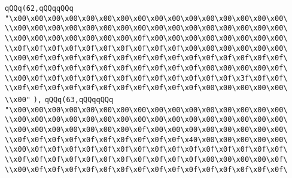 \verb|qQQq(62,qQQqqQQq|\newline
\verb|"\x00\x00\x00\x00\x00\x00\x00\x00\x00\x00\x00\x00\x00\x00\x00\x00\|\newline
\verb|\\x00\x00\x00\x00\x00\x00\x00\x00\x00\x00\x00\x00\x00\x00\x00\x00\|\newline
\verb|\\x00\x00\x00\x00\x00\x00\x00\x0f\x00\x00\x00\x00\x00\x00\x00\x00\|\newline
\verb|\\x0f\x0f\x0f\x0f\x0f\x0f\x0f\x0f\x0f\x0f\x00\x00\x00\x00\x00\x00\|\newline
\verb|\\x00\x0f\x0f\x0f\x0f\x0f\x0f\x0f\x0f\x0f\x0f\x0f\x0f\x0f\x0f\x0f\|\newline
\verb|\\x0f\x0f\x0f\x0f\x0f\x0f\x0f\x0f\x0f\x0f\x0f\x00\x00\x00\x00\x0f\|\newline
\verb|\\x00\x0f\x0f\x0f\x0f\x0f\x0f\x0f\x0f\x0f\x0f\x0f\x0f\x3f\x0f\x0f\|\newline
\verb|\\x0f\x0f\x0f\x0f\x0f\x0f\x0f\x0f\x0f\x0f\x0f\x00\x00\x00\x00\x00\|\newline
\verb|\\x00"|\newline
\verb|),|\newline
\verb|qQQq(63,qQQqqQQq|\newline
\verb|"\x00\x00\x00\x00\x00\x00\x00\x00\x00\x00\x00\x00\x00\x00\x00\x00\|\newline
\verb|\\x00\x00\x00\x00\x00\x00\x00\x00\x00\x00\x00\x00\x00\x00\x00\x00\|\newline
\verb|\\x00\x00\x00\x00\x00\x00\x00\x0f\x00\x00\x00\x00\x00\x00\x00\x00\|\newline
\verb|\\x0f\x0f\x0f\x0f\x0f\x0f\x0f\x0f\x0f\x0f\x40\x00\x00\x00\x00\x00\|\newline
\verb|\\x00\x0f\x0f\x0f\x0f\x0f\x0f\x0f\x0f\x0f\x0f\x0f\x0f\x0f\x0f\x0f\|\newline
\verb|\\x0f\x0f\x0f\x0f\x0f\x0f\x0f\x0f\x0f\x0f\x0f\x00\x00\x00\x00\x0f\|\newline
\verb|\\x00\x0f\x0f\x0f\x0f\x0f\x0f\x0f\x0f\x0f\x0f\x0f\x0f\x0f\x0f\x0f\|\newline
